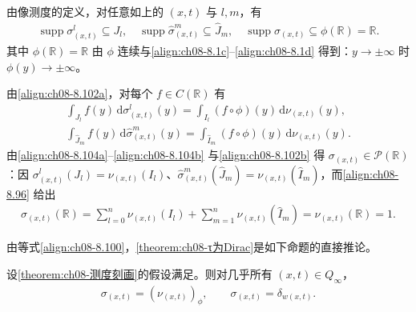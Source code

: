 \documentclass[../../main.tex]{subfiles}%
\begin{document}
由像测度的定义，对任意如上的 $(x,t)$ 与 $l,m$，有
\begin{align}
\operatorname{supp}\sigma^l_{(x,t)}\subseteq J_l,\quad
\operatorname{supp}\widehat\sigma^m_{(x,t)}\subseteq\widehat J_m,\quad
\operatorname{supp}\sigma_{(x,t)}\subseteq\phi(\mathbb{R})=\mathbb{R}. \label{align:ch08-8.103}
\end{align}
其中 $\phi(\mathbb{R})=\mathbb{R}$ 由 $\phi$ 连续与\eqref{align:ch08-8.1c}--\eqref{align:ch08-8.1d} 得到：$y\to\pm\infty$ 时 $\phi(y)\to\pm\infty$。

由\eqref{align:ch08-8.102a}，对每个 $f\in C(\mathbb{R})$ 有
\begin{align}
\int_{J_l}f(y)\,\mathrm{d}\sigma^l_{(x,t)}(y)=\int_{I_l}(f\circ\phi)(y)\,\mathrm{d}\nu_{(x,t)}(y), \label{align:ch08-8.104a}\\
\int_{\widehat J_m}f(y)\,\mathrm{d}\widehat\sigma^m_{(x,t)}(y)=\int_{\widehat I_m}(f\circ\phi)(y)\,\mathrm{d}\nu_{(x,t)}(y). \label{align:ch08-8.104b}
\end{align}
由\eqref{align:ch08-8.104a}--\eqref{align:ch08-8.104b} 与\eqref{align:ch08-8.102b} 得 $\sigma_{(x,t)}\in\mathcal{P}(\mathbb{R})$：因 $\sigma^l_{(x,t)}(J_l)=\nu_{(x,t)}(I_l)$、$\widehat\sigma^m_{(x,t)}(\widehat J_m)=\nu_{(x,t)}(\widehat I_m)$，而\eqref{align:ch08-8.96} 给出
\begin{align*}
\sigma_{(x,t)}(\mathbb{R})=\sum_{l=0}^n\nu_{(x,t)}(I_l)+\sum_{m=1}^n\nu_{(x,t)}(\widehat I_m)=\nu_{(x,t)}(\mathbb{R})=1.
\end{align*}

由等式\eqref{align:ch08-8.100}，\cref{theorem:ch08-τ为Dirac}是如下命题的直接推论。

\begin{proposition}\label{proposition:ch08-σ为Dirac}
设\cref{theorem:ch08-测度刻画}的假设满足。则对几乎所有 $(x,t)\in Q_\infty$，
\begin{align}
\sigma_{(x,t)}=(\nu_{(x,t)})_\phi,\qquad \sigma_{(x,t)}=\delta_{w(x,t)}. \label{align:ch08-8.105}
\end{align}
\end{proposition}
\end{document}

